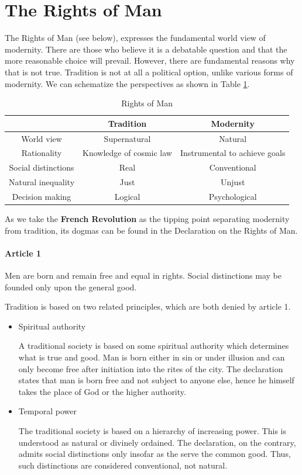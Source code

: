 \section{The Rights of Man}

The Rights of Man (see below), expresses the fundamental world view of modernity. There are those who believe it is a debatable question and that the more reasonable choice will prevail. However, there are fundamental reasons why that is not true. Tradition is not at all a political option, unlike various forms of modernity. We can schematize the perspectives as shown in Table \ref{tab:RightsMan}.

\begin{table}[h]\small
\begin{tabular}{ccc}\toprule
 &
\textbf{Tradition} &
\textbf{Modernity}\\\midrule
World view &
Supernatural &
Natural\\
Rationality &
Knowledge of cosmic law &
Instrumental to achieve goals\\
Social distinctions &
Real &
Conventional\\
Natural inequality &
Just &
Unjust\\
Decision making &
Logical &
Psychological\\\bottomrule
\end{tabular}
\label{tab:RightsMan}
\caption{Rights of Man}
\end{table}
As we take the \textbf{French Revolution} as the tipping point separating modernity from tradition, its dogmas can be found in the Declaration on the Rights of Man.

\paragraph{Article 1}
\begin{quotex}
Men are born and remain free and equal in rights. Social distinctions may be founded only upon the general good.

\end{quotex}
Tradition is based on two related principles, which are both denied by article 1.

\begin{itemize}
\item Spiritual authority

A traditional society is based on some spiritual authority which determines what is true and good. Man is born either in sin or under illusion and can only become free after initiation into the rites of the city. The declaration states that man is born free and not subject to anyone else, hence he himself takes the place of God or the higher authority. 
\item Temporal power

The traditional society is based on a hierarchy of increasing power. This is understood as natural or divinely ordained. The declaration, on the contrary, admits social distinctions only insofar as the serve the common good. Thus, such distinctions are considered conventional, not natural. 
\end{itemize}
